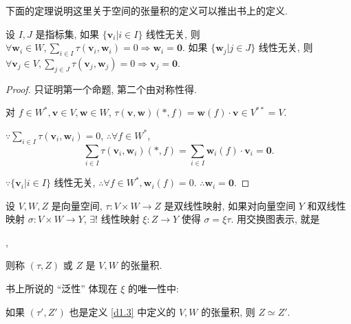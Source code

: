 \documentclass{ctexart}
\begin{document}
下面的定理说明这里关于空间的张量积的定义可以推出书上的定义.
\begin{theorem}\label{t1.5}
    设 $I,J$ 是指标集, 如果 $\{\boldsymbol{v}_i|i\in I\}$ 线性无关, 则 $\forall\boldsymbol{w}_i\in W,\sum\limits_{i\in I}\tau(\boldsymbol{v}_i,\boldsymbol{w}_i)=0\Rightarrow\boldsymbol{w}_i=\boldsymbol{0}$. 如果 $\{\boldsymbol{w}_j|j\in J\}$ 线性无关, 则 $\forall\boldsymbol{v}_j\in V,\sum\limits_{j\in J}\tau(\boldsymbol{v}_j,\boldsymbol{w}_j)=0\Rightarrow\boldsymbol{v}_j=\boldsymbol{0}$.
\end{theorem}
\begin{proof}
    只证明第一个命题, 第二个由对称性得.

    对 $f\in W^*,\boldsymbol{v}\in V,\boldsymbol{w}\in W$, $\tau(\boldsymbol{v},\boldsymbol{w})(*,f)=\boldsymbol{w}(f)\cdot\boldsymbol{v}\in V^{**}=V$.

    $\because\sum\limits_{i\in I}\tau(\boldsymbol{v}_i,\boldsymbol{w}_i)=0$, $\therefore\forall f\in W^*$,
    \[\sum\limits_{i\in I}\tau(\boldsymbol{v}_i,\boldsymbol{w}_i)(*,f)=\sum\limits_{i\in I}\boldsymbol{w}_i(f)\cdot\boldsymbol{v}_i=\boldsymbol{0}.\]

    $\because\{\boldsymbol{v}_i|i\in I\}$ 线性无关, $\therefore\forall f\in W^*,\boldsymbol{w}_i(f)=0$. $\therefore\boldsymbol{w}_i=\boldsymbol{0}$.
\end{proof}
\begin{definition}\label{d1.3}
    设 $V,W,Z$ 是向量空间, $\tau:V\times W\to Z$ 是双线性映射, 如果对向量空间 $Y$ 和双线性映射 $\sigma:V\times W\to Y$, $\exists!$ 线性映射 $\xi:Z\to Y$ 使得 $\sigma=\xi\tau$. 用交换图表示, 就是
    \begin{center}
        ,
    \end{center}
    
    则称 $(\tau,Z)$ 或 $Z$ 是 $V,W$ 的张量积.
\end{definition}
书上所说的 ``泛性'' 体现在 $\xi$ 的唯一性中:
\begin{theorem}
    如果 $(\tau',Z')$ 也是定义 \ref{d1.3} 中定义的 $V,W$ 的张量积, 则 $Z\simeq Z'$.
\end{theorem}
\end{document}
